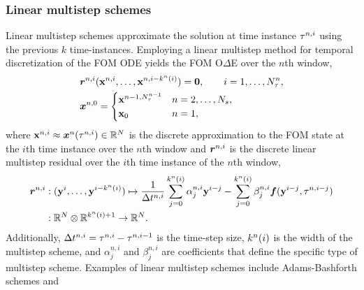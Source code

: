 \subsubsection{Linear multistep schemes}
Linear multistep schemes approximate the solution at time instance $\tau^{n,i}$ using the previous $k$ time-instances.  
Employing a linear multistep method for temporal discretization of the FOM ODE yields the FOM O$\Delta$E over the $n$th window,
\begin{align*}
&\boldsymbol r_{}^{n,i} ({\mathbf{x}}^{n,i},\ldots,{\mathbf{x}}^{n,i-k^n(i)}) = \boldsymbol 0, \qquad i=1,\ldots,N_{\tau}^{n}, \\
&\boldsymbol x^{n,0} = \begin{cases}
{\mathbf{x}}^{n-1,N_{\tau}^{n-1}} & n = 2,\ldots,N_s, \\
{{\mathbf{x}}_0} & n=1, \end{cases}
\end{align*}
where ${\mathbf{x}}^{n,i} \approx {\boldsymbol x}^{n}(\tau^{n,i}) \in \mathbb{R}^{N}$ is the discrete approximation to the FOM state at the $i$th time instance over the $n$th window and $\boldsymbol r_{}^{n,i}$ is the discrete linear multistep residual over the $i$th time instance of the $n$th window,
\begin{align*}
\boldsymbol r^{n,i} &: (\mathbf{y}^{i},\ldots,\mathbf{y}^{i-k^{n}(i)}) \mapsto  \frac{1}{\Delta t^{n,i}} \sum_{j=0}^{k^{n}(i)} \alpha^{n,i}_j \mathbf{y}^{i-j} -  \sum_{j=0}^{k^{n}(i)} \beta^{n,i}_j \boldsymbol f(\mathbf{y}^{i-j},\tau^{n,i-j}) \\
               &: \mathbb{R}^{N} \otimes \mathbb{R}^{k^{n}(i)+1} \rightarrow \mathbb{R}^{N}. 
\end{align*} 
Additionally, $\Delta t^{n,i} = \tau^{n,i} - \tau^{n,i-1}$ is the time-step size, $k^{n}(i)$ is the width of the multistep scheme, and $\alpha^{n,i}_j$ and $\beta^{n,i}_j$ are coefficients that 
define the specific type of multistep scheme. Examples of linear multistep schemes include Adams-Bashforth schemes and  
